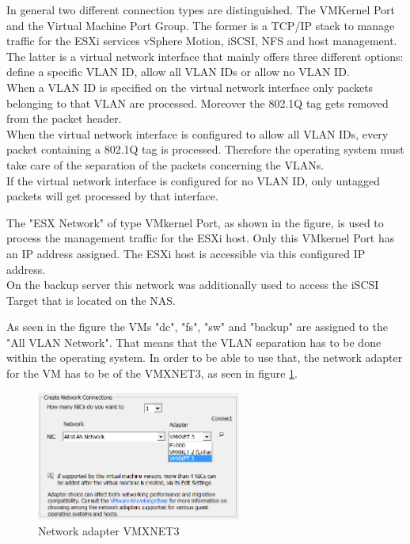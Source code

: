 In general two different connection types are distinguished. The VMKernel Port and the Virtual Machine Port Group. The former is a TCP/IP stack to manage traffic for the ESXi services vSphere Motion, iSCSI, NFS and host management. The latter is a virtual network interface that mainly offers three different options: define a specific VLAN ID, allow all VLAN IDs or allow no VLAN ID. \\
When a VLAN ID is specified on the virtual network interface only packets belonging to that VLAN are processed. Moreover the 802.1Q tag gets removed from the packet header. \\
When the virtual network interface is configured to allow all VLAN IDs, every packet containing a 802.1Q tag is processed. Therefore the operating system must take care of the separation of the packets concerning the VLANs. \\
If the virtual network interface is configured for no VLAN ID, only untagged packets will get processed by that interface.

The "ESX Network" of type VMkernel Port, as shown in the figure, is used to process the management traffic for the ESXi host. Only this VMkernel Port has an IP address assigned. The ESXi host is accessible via this configured IP address. \\
On the backup server this network was additionally used to access the iSCSI Target that is located on the NAS.

As seen in the figure the VMs "dc", "fs", "sw" and "backup" are assigned to the "All VLAN Network". That means that the VLAN separation has to be done within the operating system. In order to be able to use that, the network adapter for the VM has to be of the VMXNET3, as seen in figure \ref{img:network_adapter_vmxnet3}. 

\begin{figure}[h!]
	\centering
	\includegraphics[width=0.6\textwidth]{BilderAllgemein/vmxnet3.png}
	\caption{Network adapter VMXNET3}
	\label{img:network_adapter_vmxnet3}
\end{figure}


